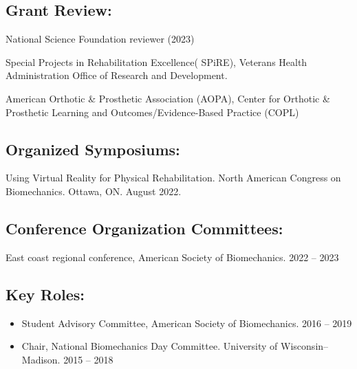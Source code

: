 \documentclass[letterpaper, 10pt]{article}
\begin{document}
\subsection{Grant Review:}
\begin{hanginglist}
    \item National Science Foundation reviewer (2023) %
    \item Special Projects in Rehabilitation Excellence( SPiRE), Veterans Health Administration Office of Research and Development.
    \item American Orthotic \& Prosthetic Association (AOPA), Center for Orthotic \& Prosthetic Learning and Outcomes/Evidence-Based Practice (COPL)
\end{hanginglist}

\subsection{Organized Symposiums:}
\begin{hanginglist}
     \item Using Virtual Reality for Physical Rehabilitation. North American Congress on Biomechanics. Ottawa, ON. August 2022.
\end{hanginglist}

\subsection{Conference Organization Committees:}
\begin{hanginglist}
     \item East coast regional conference, American Society of Biomechanics. \hfill 2022 -- 2023
\end{hanginglist}


\subsection{Key Roles:}
\begin{itemize}
    \item[] Student Advisory Committee, American Society of Biomechanics. \hfill 2016 -- 2019 %
    \item[] Chair, National Biomechanics Day Committee. University of Wisconsin--Madison. \hfill 2015 -- 2018
\end{itemize}
\end{document}
